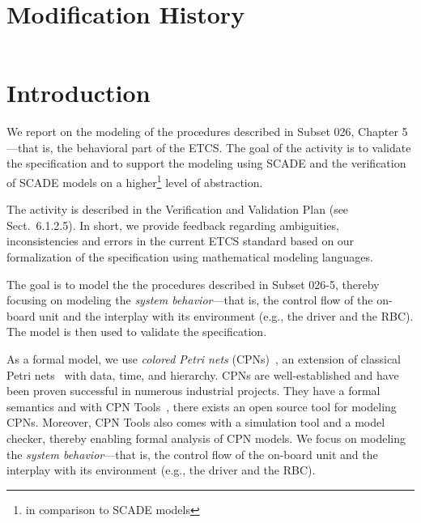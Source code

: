 \documentclass{template/openetcs_article}
\begin{document}
\section*{Modification History}
\begin{supertabular}{| m{1.2cm} | m{1.2cm} | m{6.6cm} | m{4cm} |}
 & & & \\\hline
\end{supertabular}


\tableofcontents
\listoffiguresandtables
\newpage

\section{Introduction}


We report on the modeling of the procedures described in Subset 026, Chapter 5---that is, the behavioral part of the ETCS. The goal of the activity is to validate the specification and to support the modeling using SCADE and the verification of SCADE models on a higher\footnote{in comparison to SCADE models} level of abstraction.

The activity is described in the Verification and Validation Plan (see Sect.~6.1.2.5). In short, we provide feedback regarding ambiguities, inconsistencies and errors in the current ETCS standard based on our formalization of the specification using mathematical modeling languages.

The goal is to model the the procedures described in Subset 026-5, thereby focusing on modeling the \textit{system behavior}---that is, the control flow of the on-board unit and the interplay with its environment (e.g., the driver and the RBC). The model is then used to validate the specification.

As a formal model, we use \textit{colored Petri nets} (CPNs)~\cite{CPN-book}, an extension of classical Petri nets~\cite{PNbook} with data, time, and hierarchy. CPNs are well-established and have been proven successful in numerous industrial projects. They have a formal semantics and with CPN Tools~\cite{Westergaard2013apn}, there exists an open source tool for modeling CPNs. Moreover, CPN Tools also comes with a simulation tool and a model checker, thereby enabling formal analysis of CPN models. We focus on modeling the \textit{system behavior}---that is, the control flow of the on-board unit and the interplay with its environment (e.g., the driver and the RBC). 
\end{document}
